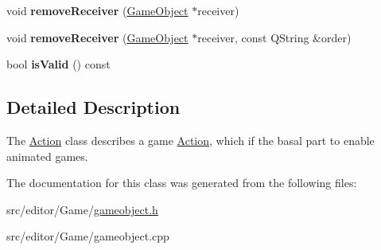 \begin{DoxyCompactItemize}
\item 
\hypertarget{class_action_a22aa74579ef4c58fa0e24563b8891053}{void {\bfseries remove\-Receiver} (\hyperlink{class_game_object}{\-Game\-Object} $\ast$receiver)}\label{class_action_a22aa74579ef4c58fa0e24563b8891053}

\item 
\hypertarget{class_action_a774aebe6706e31b59d8d3cf4c7a947ac}{void {\bfseries remove\-Receiver} (\hyperlink{class_game_object}{\-Game\-Object} $\ast$receiver, const \-Q\-String \&order)}\label{class_action_a774aebe6706e31b59d8d3cf4c7a947ac}

\item 
\hypertarget{class_action_a867da97ffa4dd10e114f0e500c41e5d2}{bool {\bfseries is\-Valid} () const }\label{class_action_a867da97ffa4dd10e114f0e500c41e5d2}

\end{DoxyCompactItemize}


\subsection{\-Detailed \-Description}
\-The \hyperlink{class_action}{\-Action} class describes a game \hyperlink{class_action}{\-Action}, which if the basal part to enable animated games. 

\-The documentation for this class was generated from the following files\-:\begin{DoxyCompactItemize}
\item 
src/editor/\-Game/\hyperlink{gameobject_8h}{gameobject.\-h}\item 
src/editor/\-Game/gameobject.\-cpp\end{DoxyCompactItemize}
